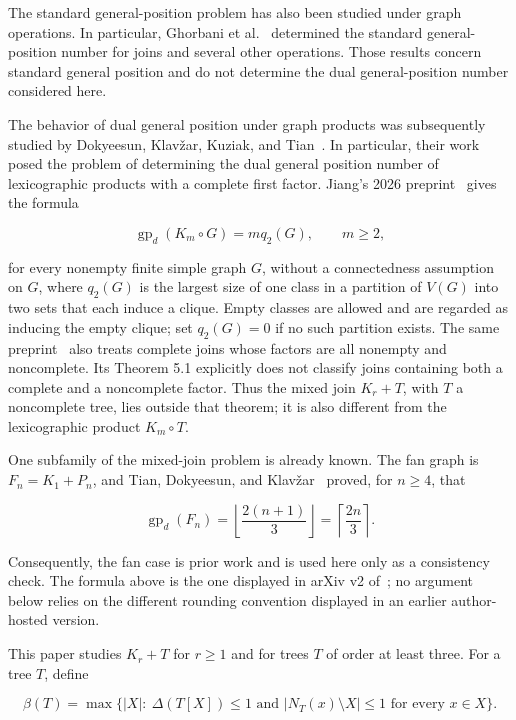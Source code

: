 \documentclass[11pt,a4paper]{article}
\numberwithin{equation}{section}
\begin{document}
The standard general-position problem has also been studied under graph
operations. In particular, Ghorbani et al.~\cite{ghorbani-et-al-operations}
determined the standard general-position number for joins and several
other operations. Those results concern standard general position and do
not determine the dual general-position number considered here.

The behavior of dual general position under graph products was
subsequently studied by Dokyeesun, Klav\v{z}ar, Kuziak, and Tian~\cite{dokyeesun-et-al-products}. In
particular, their work posed the problem of determining the dual general
position number of lexicographic products with a complete first factor.
Jiang's 2026 preprint~\cite[Theorem 3.2]{jiang-complete-first-factor} gives the formula

\[
\operatorname{gp}_d(K_m\circ G)=m q_2(G), \qquad m\ge 2,
\]

for every nonempty finite simple graph \(G\), without a connectedness
assumption on \(G\), where \(q_2(G)\) is the
largest size of one class in a partition of \(V(G)\) into two sets that
each induce a clique. Empty classes are allowed and are regarded as
inducing the empty clique; set \(q_2(G)=0\) if no such partition exists. The
same preprint~\cite[Theorem 5.1]{jiang-complete-first-factor} also treats
complete joins whose factors are all nonempty and noncomplete. Its Theorem 5.1 explicitly
does not classify joins containing both a complete and a noncomplete
factor. Thus the mixed join \(K_r+T\), with \(T\) a noncomplete tree,
lies outside that theorem; it is also different from the lexicographic
product \(K_m\circ T\).

One subfamily of the mixed-join problem is already known. The fan graph
is \(F_n=K_1+P_n\), and Tian, Dokyeesun, and Klav\v{z}ar~\cite[arXiv v2]{tian-et-al-removal}
proved, for \(n\ge 4\), that

\nopagebreak[4]
\[
\operatorname{gp}_d(F_n)
=\left\lfloor\frac{2(n+1)}{3}\right\rfloor
=\left\lceil\frac{2n}{3}\right\rceil.
\]

Consequently, the fan case is prior work and is used here only as a
consistency check. The formula above is the one displayed in arXiv v2
of~\cite{tian-et-al-removal}; no argument below relies on the different
rounding convention displayed in an earlier author-hosted version.

This paper studies \(K_r+T\) for \(r\ge 1\) and for trees \(T\) of order
at least three. For a tree \(T\), define

\[
\beta(T)=\max\bigl\{|X|:\ \Delta(T[X])\le 1
\text{ and } |N_T(x)\setminus X|\le 1\text{ for every }x\in X\bigr\}.
\]
\end{document}
